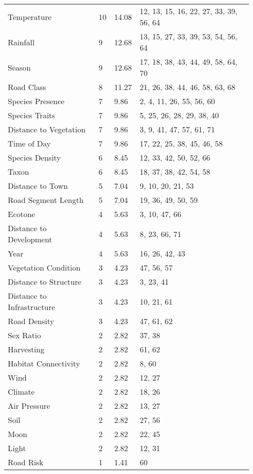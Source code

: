 \begin{longtable}[c]{p{3.5cm}p{2.0cm}p{2.5cm}p{5.5cm}}
  Temperature &  10 & 14.08 & 12, 13, 15, 16, 22, 27, 33, 39, 56, 64 \\ 
  Rainfall &   9 & 12.68 & 13, 15, 27, 33, 39, 53, 54, 56, 64 \\ 
  Season &   9 & 12.68 & 17, 18, 38, 43, 44, 49, 58, 64, 70 \\ 
  Road Class &   8 & 11.27 & 21, 26, 38, 44, 46, 58, 63, 68 \\ 
  Species Presence &   7 & 9.86 & 2, 4, 11, 26, 55, 56, 60 \\ 
  Species Traits &   7 & 9.86 & 5, 25, 26, 28, 29, 38, 40 \\ 
  Distance to Vegetation &   7 & 9.86 & 3, 9, 41, 47, 57, 61, 71 \\ 
  Time of Day &   7 & 9.86 & 17, 22, 25, 38, 45, 46, 58 \\ 
  Species Density &   6 & 8.45 & 12, 33, 42, 50, 52, 66 \\ 
  Taxon &   6 & 8.45 & 18, 37, 38, 42, 54, 58 \\ 
  Distance to Town &   5 & 7.04 & 9, 10, 20, 21, 53 \\ 
  Road Segment Length &   5 & 7.04 & 19, 36, 49, 50, 59 \\ 
  Ecotone &   4 & 5.63 & 3, 10, 47, 66 \\ 
  Distance to Development &   4 & 5.63 & 8, 23, 66, 71 \\ 
  Year &   4 & 5.63 & 16, 26, 42, 43 \\ 
  Vegetation Condition &   3 & 4.23 & 47, 56, 57 \\ 
  Distance to Structure &   3 & 4.23 & 3, 23, 41 \\ 
  Distance to Infrastructure &   3 & 4.23 & 10, 21, 61 \\ 
  Road Density &   3 & 4.23 & 47, 61, 62 \\ 
  Sex Ratio &   2 & 2.82 & 37, 38 \\ 
  Harvesting &   2 & 2.82 & 61, 62 \\ 
  Habitat Connectivity &   2 & 2.82 & 8, 60 \\ 
  Wind &   2 & 2.82 & 12, 27 \\ 
  Climate &   2 & 2.82 & 18, 26 \\ 
  Air Pressure &   2 & 2.82 & 13, 27 \\ 
  Soil &   2 & 2.82 & 27, 56 \\ 
  Moon &   2 & 2.82 & 22, 45 \\ 
  Light &   2 & 2.82 & 12, 31 \\ 
  Road Risk &   1 & 1.41 & 60 \\ 

\end{longtable}
